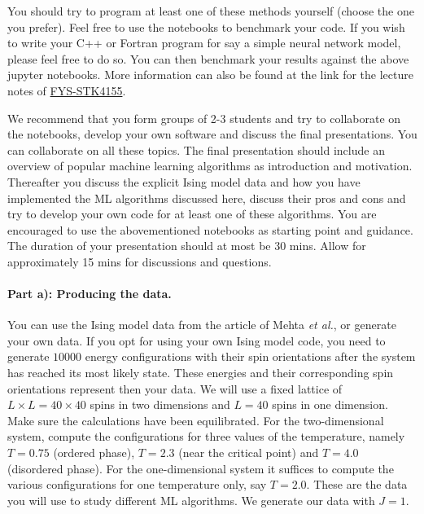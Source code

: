 \documentclass[%
oneside,                 %
final,                   %
10pt]{article}
\begin{document}
You should try to program at least one of these methods yourself (choose the one you prefer). 
Feel free to use the notebooks to benchmark your code.  If you wish to write your C++ or Fortran program for say a simple neural network model, please feel free to do so.
You can then benchmark your results against the above jupyter notebooks.  More information can also be found at the link for the lecture notes of \href{{https://compphysics.github.io/MachineLearning/doc/web/course.html}}{FYS-STK4155}.


We recommend that you form groups of 2-3 students and try to
collaborate on the notebooks, develop your own software and discuss
the final presentations. You can collaborate on all these topics. The
final presentation should include an overview of popular machine
learning algorithms as introduction and motivation. Thereafter you
discuss the explicit Ising model data and how you have implemented the
ML algorithms discussed here, discuss their pros and cons and try to
develop your own code for at least one of these algorithms.  You are
encouraged to use the abovementioned notebooks as starting point and
guidance.  The duration of your presentation should at most be 30
mins. Allow for approximately 15 mins for discussions and questions.



\paragraph{Part a): Producing the data.}
You can use the Ising model data from the article of Mehta \emph{et al.}, or generate your own data. 
If you opt for using your own Ising model code, you need to generate $10000$ energy configurations with their spin orientations after the system has reached its most likely state. These energies and their corresponding spin orientations
represent then your data. 
We will use a fixed lattice of $L\times L = 40 \times 40$ spins in two dimensions and $L=40$ spins in one dimension. 
Make sure the calculations have been equilibrated. For the two-dimensional system, compute the configurations 
for three values of the temperature, namely $T=0.75$ (ordered phase), $T=2.3$ (near the critical point)  and $T=4.0$ (disordered phase).
For the one-dimensional system it suffices to compute the various configurations for one temperature only, say $T=2.0$.
These are the data you will use to study different ML algorithms.
We generate our data with $J=1$.
\end{document}
